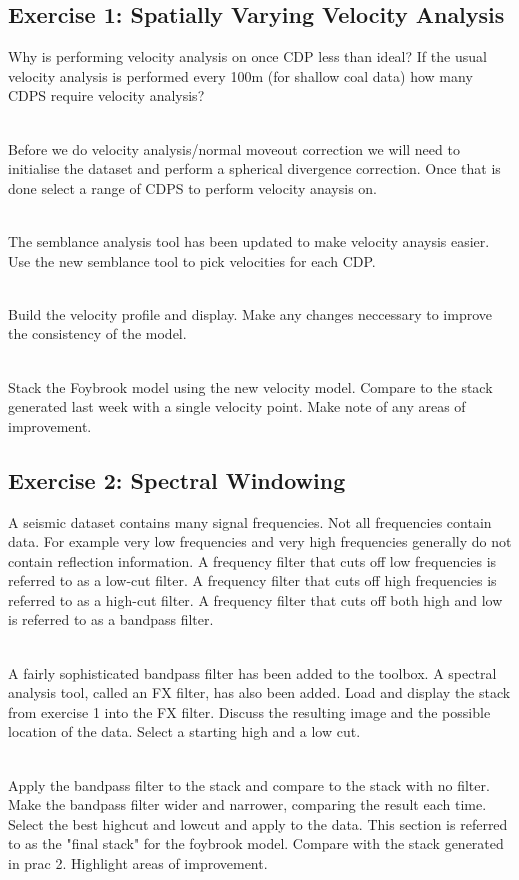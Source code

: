 \subsection*{Exercise 1: Spatially Varying Velocity Analysis}
Why is performing velocity analysis on once CDP less than ideal? If the usual velocity analysis is performed every 100m (for shallow coal data) how many CDPS require velocity analysis?
\par~\\
Before we do velocity analysis/normal moveout correction we will need to initialise the dataset and perform a spherical divergence correction.  Once that is done select a range of CDPS to perform velocity anaysis on. 
\par~\\
The semblance analysis tool has been updated to make velocity anaysis easier. Use the new semblance tool to pick velocities for each CDP.
\par~\\
Build the velocity profile and display.  Make any changes neccessary to improve the consistency of the model. 
\par~\\
Stack the Foybrook model using the new velocity model.  Compare to the stack generated last week with a single velocity point.  Make note of any areas of improvement.

\subsection*{Exercise 2: Spectral Windowing}
A seismic dataset contains many signal frequencies.  Not all frequencies contain data.  For example very low frequencies and very high frequencies generally do not contain reflection information.  A frequency filter that cuts off low frequencies is referred to as a low-cut filter.  A frequency filter that cuts off high frequencies is referred to as a high-cut filter.  A frequency filter that cuts off both high and low is referred to as a bandpass filter.  
\par~\\
A fairly sophisticated bandpass filter has been added to the toolbox. A spectral analysis tool, called an FX filter, has also been added.  Load and display the stack from exercise 1 into the FX filter.  Discuss the resulting image and the possible location of the data.  Select a starting high and a low cut.
\par~\\
Apply the bandpass filter to the stack and compare to the stack with no filter.  Make the bandpass filter wider and narrower, comparing the result each time.  Select the best highcut and lowcut and apply to the data.  This section is referred to as the "final stack" for the foybrook model. Compare with the stack generated in prac 2. Highlight areas of improvement.

